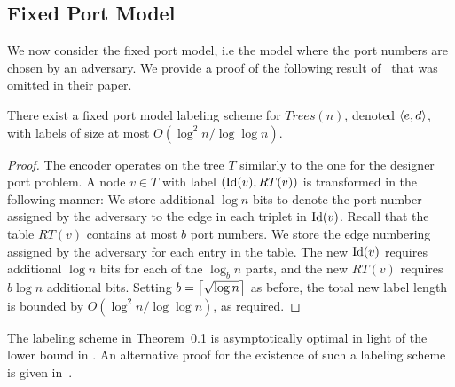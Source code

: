 \subsection{Fixed Port Model}\label{sec:ThorupZwickFixedPort}
We now consider the fixed port  model, i.e  the model where the port numbers are chosen by an adversary. 
We provide a proof of the following result of~\cite{Thorup01} that was omitted in their paper.
\begin{theorem} \label{thm:routing-upper-fixed}  	
	There exist a fixed  port model \routing labeling scheme for $Trees(n)$, denoted  $\left \langle e,d \right \rangle $, with labels of size at most $O(\log^2 n / \log \log n)$.
\end{theorem}
\begin{proof}
	The encoder operates on the tree $T$  similarly to the one for the designer port problem.
		A node $v \in T$ with label $(\operatorname{Id}(v),RT(v))$ is transformed in the following manner:
		We store  additional  $\log n$ bits to denote the port number assigned by the adversary to the edge in each triplet in $\operatorname{Id}(v)$.
		Recall that the \routing table $RT(v)$ contains at most $b$ port numbers. We store the edge numbering  assigned by the adversary for each entry in the table.
		The new $\operatorname{Id}(v)$ requires  additional $\log n$ bits for each of the $\log_b n$ parts, and the new $RT(v)$ requires $b  \log n$ additional bits.  Setting $b= \left\lceil{ \sqrt{ \log n}}\right\rceil$ as before,  the total new label length is bounded by $O(\log^2 n / \log \log n)$, as required.	
\end{proof}

The labeling scheme in Theorem~\ref{sec:ThorupZwickFixedPort} is asymptotically optimal in light of  the lower bound in \cite{fraigniaud2002space}. An alternative proof for the existence  of such a labeling scheme is  given in~\cite{Fraigniaud01}.



%
%
%







	



	
